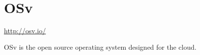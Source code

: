 \chapter{OSv}
\label{chap:OSv}

\url{http://osv.io/}

OSv is the open source operating system designed for the cloud.